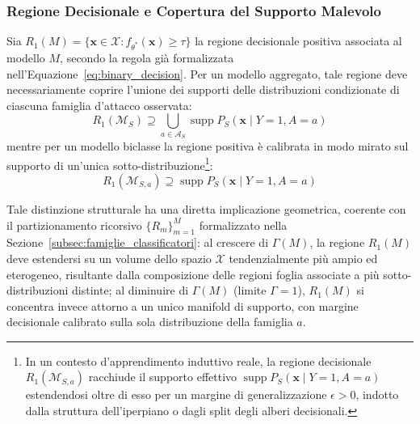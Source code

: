 \subsubsection{Regione Decisionale e Copertura del Supporto Malevolo}
\label{subsubsec:regione_decisionale}
Sia $R_1(M) = \{\mathbf{x} \in \mathcal{X} : f_{\theta^*}(\mathbf{x}) \ge \tau\}$ la regione decisionale positiva associata al modello $M$, secondo la regola già formalizzata nell'Equazione~\eqref{eq:binary_decision}. Per un modello aggregato, tale regione deve necessariamente coprire l'unione dei supporti delle distribuzioni condizionate di ciascuna famiglia d'attacco osservata:
\begin{equation}
    R_1(\mathcal{M}_S) \supseteq \bigcup_{a \in \mathcal{A}_S} \operatorname{supp} P_S(\mathbf{x} \mid Y=1, A=a)
    \label{eq:region_aggregate}
\end{equation}
mentre per un modello biclasse la regione positiva è calibrata in modo mirato sul supporto di un'unica sotto-distribuzione\footnote{In un contesto d'apprendimento induttivo reale, la regione decisionale $R_1(\mathcal{M}_{S,a})$ racchiude il supporto effettivo $\operatorname{supp} P_S(\mathbf{x} \mid Y=1, A=a)$ estendendosi oltre di esso per un margine di generalizzazione $\epsilon > 0$, indotto dalla struttura dell'iperpiano o dagli split degli alberi decisionali.}:
\begin{equation}
    R_1(\mathcal{M}_{S,a}) \supseteq \operatorname{supp} P_S(\mathbf{x} \mid Y=1, A=a)
    \label{eq:region_biclasse}
\end{equation}

Tale distinzione strutturale ha una diretta implicazione geometrica, coerente con il partizionamento ricorsivo $\{R_m\}_{m=1}^M$ formalizzato nella Sezione~\ref{subsec:famiglie_classificatori}: al crescere di $\Gamma(M)$, la regione $R_1(M)$ deve estendersi su un volume dello spazio $\mathcal{X}$ tendenzialmente più ampio ed eterogeneo, risultante dalla composizione delle regioni foglia associate a più sotto-distribuzioni distinte; al diminuire di $\Gamma(M)$ (limite $\Gamma=1$), $R_1(M)$ si concentra invece attorno a un unico manifold di supporto, con margine decisionale calibrato sulla sola distribuzione della famiglia $a$.

